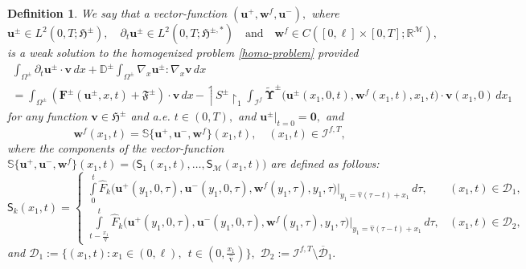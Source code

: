 \documentclass[reqno]{amsart}            %
\newtheorem{definition}{Definition}[section]
\numberwithin{equation}{section}
\begin{document}
	\begin{definition}\label{Def-}
		We say that a vector-function $(\mathbf{u}^+, \mathbf{w}^f, \mathbf{u}^-),$ where
		$$
		\mathbf{u}^\pm \in L^2(0,T; \boldsymbol{\mathfrak{H}}^{\pm}), \quad \partial_t \mathbf{u}^\pm \in L^2(0,T; \boldsymbol{\mathfrak{H}}^{\pm, *}) \quad \text{and} \quad \mathbf{w}^f \in C([0, \ell] \times [0,T]; \mathbb{R}^\mathcal{M}),
		$$
		is a weak solution to the homogenized problem \eqref{homo-problem} provided
		\begin{multline}\label{eq23}
			\int_{\Omega^\pm} \partial_t \mathbf{u}^\pm \cdot \mathbf{v} \, dx + \mathbb{D}^\pm\int_{\Omega^\pm} \nabla_x  \mathbf{u}^\pm :  \nabla_x \mathbf{v} \, dx 
			\\
			= \int_{\Omega^\pm} \left(\mathbf{F}^\pm(\mathbf{u}^\pm, x, t) + \boldsymbol{\mathfrak{F}}^\pm\right) \cdot \mathbf{v}\, dx  \, - 
			\upharpoonleft\!\! {S}^\pm\!\!\upharpoonright_1 \int_{\mathcal{I}^f} \widetilde{\boldsymbol{\Upsilon}}^\pm\big(\mathbf{u}^\pm(x_1,0,t), \mathbf{w}^f(x_1,t), x_1, t \big) \cdot \mathbf{v}(x_1,0)\, dx_1
		\end{multline}
		for any function $\mathbf{v} \in \boldsymbol{\mathfrak{H}}^{\pm}$ and a.e. $t \in (0, T),$ and $\mathbf{u}^\pm|_{t=0}=\mathbf{0},$ and
		\begin{equation}\label{eq24}
			\mathbf{w}^f(x_1,t) = \mathbb{S}\{\mathbf{u}^+, \mathbf{u}^-,\mathbf{w}^f\}(x_1,t), \quad (x_1, t) \in \mathcal{I}^{f, T},
		\end{equation}
		where the components of the  vector-function $\mathbb{S}\{\mathbf{u}^+, \mathbf{u}^-,\mathbf{w}^f\}(x_1,t)= \big(\mathsf{S}_1(x_1,t),\ldots, \mathsf{S}_\mathcal{M}(x_1,t)\big)$ are defined as follows: 
		\begin{equation}\label{eq25}
			\mathsf{S}_k(x_1,t)=
			\left\{
			\begin{array}{ll}
				\displaystyle  \int\limits_{0}^{t} \widehat{F}_k \big(\mathbf{u}^+(y_1, 0, \tau), \mathbf{u}^-(y_1, 0, \tau),\mathbf{w}^f(y_1, \tau),  y_1, \tau\big)\big|_{y_1 = \hat{\mathrm{v}}(\tau -t) +x_1} 
				\, d\tau  , &  (x_1,t) \in \mathcal{D}_1 ,
				\\
				\displaystyle 
				\int\limits_{t - \frac{x_1}{\hat{\mathrm{v}}}}^{t}  \widehat{F}_k\big(\mathbf{u}^+(y_1, 0, 
				\tau), \mathbf{u}^-(y_1, 0, \tau), \mathbf{w}^f(y_1, \tau),  y_1, \tau\big)\big|_{y_1 = \hat{\mathrm{v}}(\tau -t) +x_1}  \, d\tau   , & (x_1,t) \in  \mathcal{D}_2,
			\end{array}
			\right.
		\end{equation}
		and $\mathcal{D}_1 :=\{(x_1, t)\colon x_1 \in (0, \ell), \ \ t \in (0, \frac{x_1}{\hat{\mathrm{v}}})\}
		,$
		$\mathcal{D}_2 :=  \mathcal{I}^{f, T} \setminus \overline{\mathcal{D}}_1.$ 
	\end{definition}
	
\end{document}
